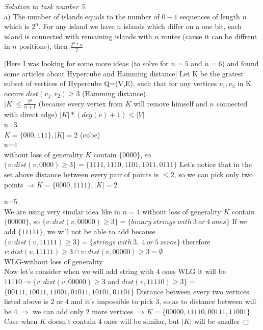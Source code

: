 \documentclass[12pt,a4paper]{article}
\begin{document}
\vspace{1cm}


\begin{proof}[Solution to task number 5]
\
\\

a) The number of islands equals to the number of $0-1$ sequences of length $n$ which is $2^n$. For any island we have $n$ islands which differ on a one bit, each island is connected with remaining islands with $n$ routes (cause it can be diffrent in $n$ positions), then $\frac{2^n*n}{2}$ 

[Here I was looking for some more ideas (to solve for $n=5$ and $n=6$) and found some articles about Hypercube and Hamming distance]
Let K be the gratest subset of vertices of Hypercube Q=(V,E), such that for any vertices $v_1,v_2$ in K occurs $dist(v_1,v_2)\geq3$ (Hamming distance).
\\
$|K|\leq \frac{2^n}{n+1}$ (because every vertex from $K$ will remove himself and $n$ connected with direct edge)
$|K|*(deg(v)+1)\leq |V|$\\

n=3\\

$K=\{000,111\}, |K|=2$ (cube)\\


n=4\\
without loss of generality $K$ contain $\{0000\}$, so
$\{v: dist(v,0000)\geq 3\}=\{1111,1110,1101,1011,0111\}$
Let's notice that  in the set above distance between every pair of points is $\leq2$, so we can pick only two points $\Rightarrow K=\{0000,1111\}, |K|=2$

n=5\\
We are using very similar idea like in $n=4$
without loss of generality $K$ contain $\{00000\}$, so $\{v: dist(v,00000)\geq 3\}=\{binary\ strings\ with\ 3\ or\ 4\  ones\}$
If we add $\{11111\}$, we will not be able to add because $\{v: dist(v,11111)\geq 3\}=\{strings\ with\ 3,\ 4\ or\ 5\ zeros\}$ therefore ${v: dist(v,11111)\geq 3} \cap {v: dist(v,00000)\geq 3}=\emptyset$
\\
WLG-without loss of generality\\
Now let's consider when we will add string with $4$ ones WLG  it will be $11110 \Rightarrow 
\{v: dist(v,00000)\geq 3$ and  $dist(v,11110)\geq 3\}=$\\ $\{00111,10011,11001,01011,10101,01101\}$
Distance between every two vertices listed above is $2$ or $4$ and it's impossible to pick $3$, so as to distance between will be $4$.$\Rightarrow$ we can add only $2$ more vertices $\Rightarrow K=\{00000,11110,00111,11001\}$  \\
Case when $K$ doesn't contain $4$ ones will  be similar, but $|K|$ will be smaller


\end{proof}
\end{document}
